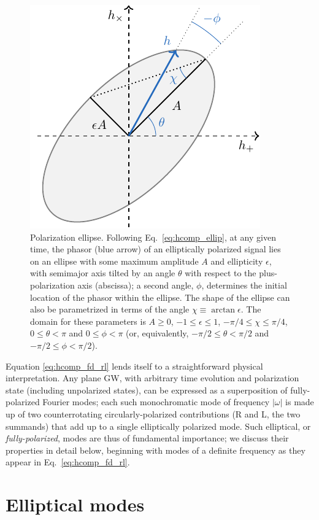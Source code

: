 \documentclass[aps,prd,twocolumn,superscriptaddress,preprintnumbers,floatfix,nofootinbib]{revtex4-2}
\newcommand*{\eq}[1]{Eq.~\eqref{eq:#1}}
\begin{document}
\begin{figure}
\includegraphics[width=0.65\columnwidth]{diagram_ellipse.pdf}
\caption{Polarization ellipse. Following \eq{hcomp_ellip}, at any given time, the phasor (blue arrow) of an elliptically polarized signal lies on an ellipse with some maximum amplitude $A$ and ellipticity $\epsilon$, with semimajor axis tilted by an angle $\theta$ with respect to the plus-polarization axis (abscissa); a second angle, $\phi$, determines the initial location of the phasor within the ellipse.
The shape of the ellipse can also be parametrized in terms of the angle $\chi \equiv \arctan \epsilon$.
The domain for these parameters is $A \geq 0$, $-1 \leq \epsilon \leq 1$, $-\pi/4 \leq \chi \leq \pi/4$, $0 \leq \theta < \pi$ and $0 \leq \phi < \pi$ (or, equivalently, $-\pi/2 \leq \theta < \pi/2$ and $-\pi/2 \leq \phi < \pi/2$).
}
\label{fig:ellipse}
\end{figure}

Equation \eqref{eq:hcomp_fd_rl} lends itself to a straightforward physical interpretation.
Any plane GW, with arbitrary time evolution and polarization state (including unpolarized states), can be expressed as a superposition of fully-polarized Fourier modes;
each such monochromatic mode of frequency $|\omega|$ is made up of two counterrotating circularly-polarized contributions (R and L, the two summands) that add up to a single elliptically polarized mode.
Such elliptical, or \emph{fully-polarized}, modes are thus of fundamental importance; we discuss their properties in detail below, beginning with modes of a definite frequency as they appear in \eq{hcomp_fd_rl}.

\section{Elliptical modes}
\label{sec:ellip_modes}
\end{document}
